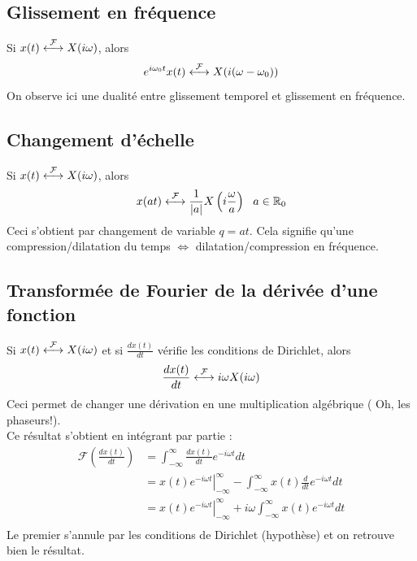 \subsection{Glissement en fréquence}
Si $x(t) \ft X(i\omega)$, alors 
\begin{equation}
	e^{i\omega_0t}x(t) \ft X(i(\omega-\omega_0))
\end{equation}
On observe ici une dualité entre glissement temporel et glissement 
en fréquence.\\
	
	
\subsection{Changement d'échelle}
Si $x(t) \ft X(i\omega)$, alors 
\begin{equation}
	x(at) \ft \frac{1}{|a|}X\left(i\frac{\omega}{a}\right)\ \ a\in\mathbb{R}
	_0
\end{equation}
Ceci s'obtient par changement de variable $q=at$. Cela signifie qu'une 
compression/dilatation du temps $\Leftrightarrow$ dilatation/compression 
en fréquence.

\subsection{Transformée de Fourier de la dérivée d'une fonction}
Si $x(t) \ft X(i\omega)$ et si $\frac{dx(t)}{dt}$ vérifie les conditions
de Dirichlet, alors
\begin{equation}
	\frac{dx(t)}{dt} \ft i\omega X(i\omega)
\end{equation}
Ceci permet de changer une dérivation en une multiplication algébrique (
Oh, les phaseurs!).\\
Ce résultat s'obtient en intégrant par partie :
\begin{equation}
	\begin{array}{ll}
		\mathcal{F}\left(\frac{dx(t)}{dt}\right) & = \int_{-\infty}^\infty \frac{dx(t)}                                            
		{dt}e^{-i\omega t}dt\\
		                                         & = \left.x(t)e^{-i\omega t}\right|_{-\infty}^\infty - \int_{-\infty}^\infty x(t) 
		\frac{d}{dt}e^{-i\omega t}dt\\
		                                         & = \left.x(t)e^{-i\omega t}\right|_{-\infty}^\infty +i\omega \int_{-\infty}^     
		\infty x(t)e^{-i\omega t}dt\\
	\end{array}
\end{equation}
Le premier s'annule par les conditions de Dirichlet (hypothèse) et on retrouve 
bien le résultat.
		
